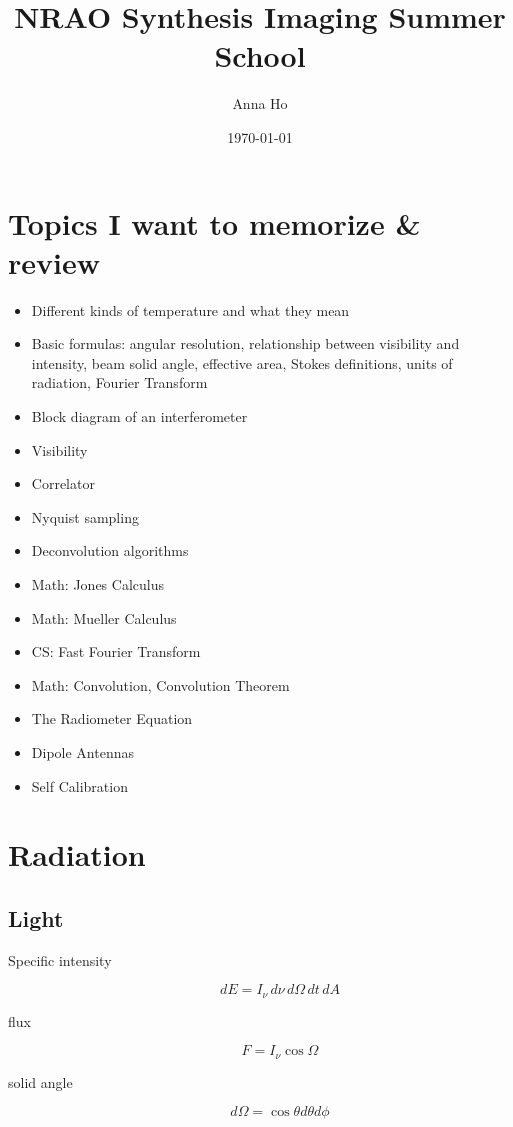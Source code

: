\documentclass[a4paper]{article}
\title{NRAO Synthesis Imaging Summer School}
\author{Anna Ho}
\date{\today}
\begin{document}
\maketitle

\section{Topics I want to memorize \& review}

\begin{itemize}

\item Different kinds of temperature and what they mean
\item Basic formulas: angular resolution, relationship between visibility and intensity, beam solid angle, effective area, Stokes definitions, units of radiation, Fourier Transform
\item Block diagram of an interferometer
\item Visibility
\item Correlator
\item Nyquist sampling
\item Deconvolution algorithms
\item Math: Jones Calculus
\item Math: Mueller Calculus
\item CS: Fast Fourier Transform
\item Math: Convolution, Convolution Theorem
\item The Radiometer Equation
\item Dipole Antennas
\item Self Calibration


\end{itemize}

\section{Radiation}

\subsection{Light}

\begin{description}

\item[Specific intensity] 
$$ dE = I_\nu \, d\nu \, d\Omega \, dt \, dA $$

\item[flux]
$$ F = I_\nu \cos \Omega $$

\item[solid angle]
$$ d\Omega = \cos\theta d\theta d\phi $$

\end{description}
\end{document}
